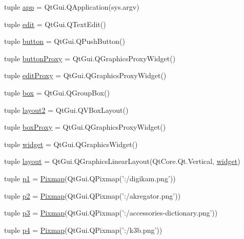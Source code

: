 \begin{DoxyCompactItemize}
\item 
tuple \hyperlink{namespacestates_ad28306c70ff5e9b1060d0f23f79d5e23}{app} = Qt\+Gui.\+Q\+Application(sys.\+argv)
\item 
tuple \hyperlink{namespacestates_ae029cf3c21cbcdd8fa88586878492edc}{edit} = Qt\+Gui.\+Q\+Text\+Edit()
\item 
tuple \hyperlink{namespacestates_ab6e634155862a8c4a3ba53686ba9f1de}{button} = Qt\+Gui.\+Q\+Push\+Button()
\item 
tuple \hyperlink{namespacestates_ab4f1d20293f951de72c060e085560681}{button\+Proxy} = Qt\+Gui.\+Q\+Graphics\+Proxy\+Widget()
\item 
tuple \hyperlink{namespacestates_a98cf7e360f4a80c35791d3d1493fbf26}{edit\+Proxy} = Qt\+Gui.\+Q\+Graphics\+Proxy\+Widget()
\item 
tuple \hyperlink{namespacestates_a500d5d2547d02fc40e81e8cb66e04763}{box} = Qt\+Gui.\+Q\+Group\+Box()
\item 
tuple \hyperlink{namespacestates_ac05f4090fe16a6235c90028a4a4b8815}{layout2} = Qt\+Gui.\+Q\+V\+Box\+Layout()
\item 
tuple \hyperlink{namespacestates_aebb5c2a423cc3bd4da9b5cf57151089b}{box\+Proxy} = Qt\+Gui.\+Q\+Graphics\+Proxy\+Widget()
\item 
tuple \hyperlink{namespacestates_a258754aba959b1b63fe8ea95046db14e}{widget} = Qt\+Gui.\+Q\+Graphics\+Widget()
\item 
tuple \hyperlink{namespacestates_ac759b5911bd2caa864d8b83547b4e064}{layout} = Qt\+Gui.\+Q\+Graphics\+Linear\+Layout(Qt\+Core.\+Qt.\+Vertical, \hyperlink{namespacestates_a258754aba959b1b63fe8ea95046db14e}{widget})
\item 
tuple \hyperlink{namespacestates_ae8f66049ab43399ddd8c9f0a2f9ce543}{p1} = \hyperlink{classstates_1_1Pixmap}{Pixmap}(Qt\+Gui.\+Q\+Pixmap('\+:/digikam.\+png'))
\item 
tuple \hyperlink{namespacestates_af640837772eb5d6c61bd58181140f633}{p2} = \hyperlink{classstates_1_1Pixmap}{Pixmap}(Qt\+Gui.\+Q\+Pixmap('\+:/akregator.\+png'))
\item 
tuple \hyperlink{namespacestates_ae4b38fcb744ae566b88b485f02878151}{p3} = \hyperlink{classstates_1_1Pixmap}{Pixmap}(Qt\+Gui.\+Q\+Pixmap('\+:/accessories-\/dictionary.\+png'))
\item 
tuple \hyperlink{namespacestates_ae95b6fb201789c37779562e26ec003e1}{p4} = \hyperlink{classstates_1_1Pixmap}{Pixmap}(Qt\+Gui.\+Q\+Pixmap('\+:/k3b.\+png'))
\item 

\end{DoxyCompactItemize}
